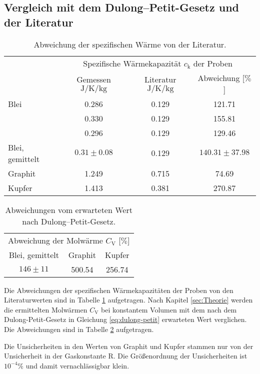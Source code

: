 \subsection{Vergleich mit dem Dulong--Petit-Gesetz und der Literatur}
\begin{table}[htbp]
	\centering
	\begin{tabular}{lccc}
		\toprule
		&\multicolumn{3}{c}{Spezifische Wärmekapazität $c_\text{k}$ der Proben}\\
		&{Gemessen $\si{\joule\per\kelvin\per\kilo\gram}$}  &{Literatur $\si{\joule\per\kelvin\per\kilo\gram}$}& {Abweichung [$\%$]}\\
		\midrule
		{Blei}	&0.286	&0.129	&121.71\\
				&0.330	&0.129	&155.81\\
		 		&0.296	&0.129	&129.46\\
		{Blei, gemittelt}	&$0.31\pm0.08$	&0.129	&$140.31\pm 37.98$\\
		{Graphit}&1.249 &0.715& 74.69\\
		{Kupfer}&1.413	&0.381	& 270.87\\
		\bottomrule
	\end{tabular}
	\caption{Abweichung der spezifischen Wärme von der Literatur. \cite{waermekapazitaetkupfer} \cite{waermekapazitaetblei}}
	\label{tab:compare}
\end{table}
\begin{table}[htbp]
	\centering
	\begin{tabular}{ccc}
		\toprule
		\multicolumn{3}{c}{Abweichung der Molwärme $C_\text{V}$ [$\%$]}\\
		{Blei, gemittelt}	&{Graphit}&{Kupfer}\\
		\midrule
		$146\pm11$	&500.54	&256.74\\
		\bottomrule
	\end{tabular}
	\caption{Abweichungen vom erwarteten Wert nach Dulong--Petit-Gesetz.}
	\label{tab:failz}
\end{table}
Die Abweichungen der spezifischen Wärmekapazitäten der Proben von den Literaturwerten sind in Tabelle \ref{tab:compare} aufgetragen.
Nach Kapitel \ref{sec:Theorie} werden die ermittelten Molwärmen $C_\mathup{V}$ bei konstantem Volumen mit dem nach dem Dulong-Petit-Gesetz in Gleichung \eqref{eq:dulong-petit} erwarteten Wert verglichen.
Die Abweichungen sind in Tabelle \ref{tab:failz} aufgetragen. 

Die Unsicherheiten in den Werten von Graphit und Kupfer stammen nur von der Unsicherheit in der Gaskonstante $\mathup{R}$. 
Die Größenordnung der Unsicherheiten ist $10^{-4}\%$ und damit vernachlässigbar klein.
